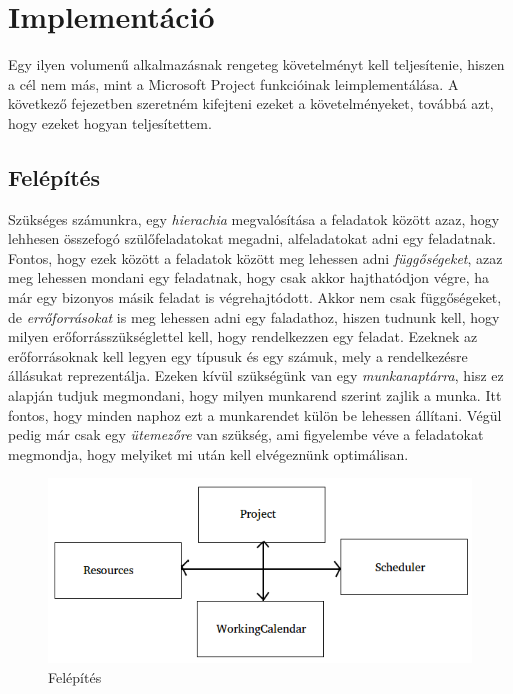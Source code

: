 \chapter{Implementáció}\label{sect:Implement}

Egy ilyen volumenű alkalmazásnak rengeteg követelményt kell teljesítenie, hiszen a cél nem más, mint a Microsoft Project funkcióinak leimplementálása. A következő fejezetben szeretném kifejteni ezeket a követelményeket, továbbá azt, hogy ezeket hogyan teljesítettem.
\section{Felépítés}

Szükséges számunkra, egy \textit{hierachia} megvalósítása a feladatok között azaz, hogy lehhesen összefogó szülőfeladatokat megadni, alfeladatokat adni egy feladatnak. Fontos, hogy ezek között a feladatok között meg lehessen adni \textit{függőségeket}, azaz meg lehessen mondani egy feladatnak, hogy csak akkor hajthatódjon végre, ha már egy bizonyos másik feladat is végrehajtódott. Akkor nem csak függőségeket, de \textit{errőforrásokat} is meg lehessen adni egy faladathoz, hiszen tudnunk kell, hogy milyen erőforrásszükséglettel kell, hogy rendelkezzen egy feladat. Ezeknek az erőforrásoknak kell legyen egy típusuk és egy számuk, mely a rendelkezésre állásukat reprezentálja. Ezeken kívül szükségünk van egy \textit{munkanaptárra}, hisz ez alapján tudjuk megmondani, hogy milyen munkarend szerint zajlik a munka. Itt fontos, hogy minden naphoz ezt a munkarendet külön be lehessen állítani. Végül pedig már csak egy \textit{ütemezőre} van szükség, ami figyelembe véve a feladatokat megmondja, hogy melyiket mi után kell elvégeznünk optimálisan.

\begin{figure}[!ht]
\centering
\includegraphics[width=\textwidth, keepaspectratio]{figures/project1.png}
\caption{Felépítés} 
\label{fig:project1}
\end{figure} 

